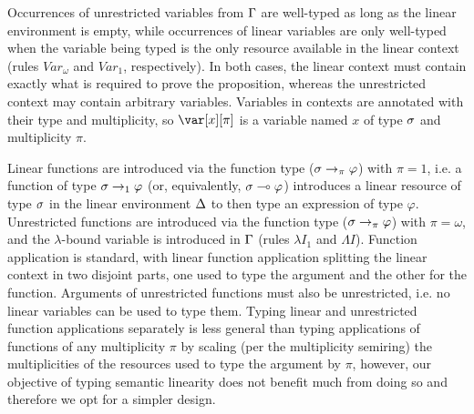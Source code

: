\documentclass[acmsmall,review,anonymous,screen]{acmart}
\newcommand{\lolli}{\multimap}
\begin{document}
Occurrences of unrestricted variables from $\Gamma$ are well-typed as long as the linear
environment is empty, while occurrences of linear variables are only well-typed
when the variable being typed is the only resource available in the
linear context (rules $Var_\omega$ and $Var_1$, respectively).
In both cases, the linear context must contain exactly what is required to
prove the proposition, whereas the unrestricted context may contain arbitrary
variables.
%
Variables in contexts are annotated with their type and multiplicity, so
$\x[\pi]$ is a variable named $x$ of type $\sigma$ and multiplicity $\pi$.

Linear functions are introduced via the function type ($\sigma \to_\pi \varphi$) with
$\pi = 1$, i.e. a function of type $\sigma \to_1 \varphi$ (or, equivalently, $\s \lolli \vp$)
introduces a linear resource of type $\sigma$ in the linear environment $\Delta$ to then type an expression of type $\varphi$.
%
Unrestricted functions are introduced via the function type ($\sigma \to_\pi \varphi$) with $\pi =
\omega$, and the $\lambda$-bound variable is introduced in $\Gamma$ (rules
$\lambda I_1$ and $\Lambda I$). Function application is standard, with
linear function application splitting the linear context in two
disjoint parts, one used to type the argument and the other for the
function.
Arguments of unrestricted functions must also be unrestricted, i.e. no
linear variables can be used to type them. 
%
Typing linear and unrestricted function applications separately is less general
than typing applications of functions of any multiplicity $\pi$ by scaling (per the multiplicity
semiring) the multiplicities of the resources used to type the argument by $\pi$, however, our objective of typing semantic
linearity does not benefit much from doing so and therefore we opt for a
simpler design. 
\end{document}
